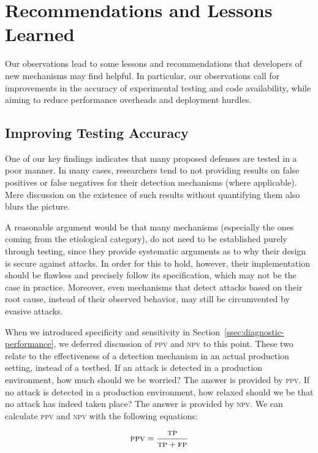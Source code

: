 \documentclass[conference]{IEEEtran}
\begin{document}
\section{Recommendations and Lessons Learned}
\label{sec:lessons-learned}

Our observations lead to some lessons and recommendations that
developers of new mechanisms may find helpful. In particular,
our observations
call for improvements in the accuracy of experimental testing
and code availability, while
aiming to reduce performance overheads and deployment hurdles.

\subsection{Improving Testing Accuracy}

One of our key findings indicates that many proposed defenses are
tested in a poor manner. In many cases, researchers tend to not providing
results on false positives or false negatives for their detection mechanisms
(where applicable).
Mere discussion on the existence of such results without quantifying
them also blurs the picture.

A reasonable argument would be that many mechanisms (especially the
ones coming from the etiological category), do not need to be
established purely through testing, since they provide systematic
arguments as to why their design is secure against attacks. In order
for this to hold, however, their implementation should be flawless
and precisely follow its specification, which may not
be the case in practice. Moreover, even mechanisms that detect attacks
based on their root cause, instead of their observed behavior, may still be
circumvented by evasive attacks.

When we introduced specificity and sensitivity in
Section~\ref{ssec:diagnostic-performance}, we deferred discussion of
\textsc{ppv} and \textsc{npv} to this point. These two relate to the
effectiveness of a detection mechanism in an actual production setting,
instead of a testbed. If an attack is detected in a production
environment, how much should we be worried? The answer is provided by
\textsc{ppv}. If no attack is detected in a production environment,
how relaxed should we be that no attack has indeed taken place? The
answer is provided by \textsc{npv}. We can calculate \textsc{ppv} and
\textsc{npv} with the following equations:

\begin{equation}
\textsc{ppv} = \frac{\textsc{tp}}{\textsc{tp} + \textsc{fp}}
\end{equation}
\end{document}
